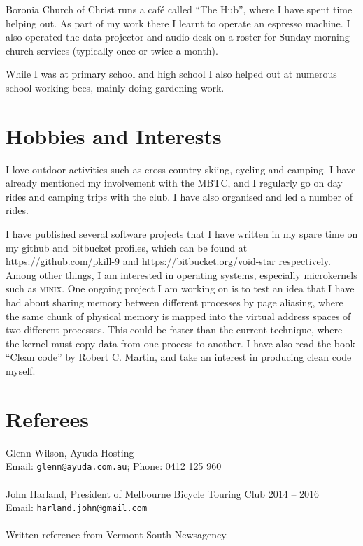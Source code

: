 \documentclass[a4paper]{article}
\begin{document}
Boronia Church of Christ runs a caf\'e called ``The Hub'', where I have
spent time helping out. As part of my work there I learnt to
operate an espresso machine. I 
also operated the data projector and audio desk on a roster for Sunday 
morning church services (typically once or twice a month).

While I was at primary school and high school I also helped out at
numerous school working bees, mainly doing gardening work.


\section{Hobbies and Interests}
I love outdoor activities such as cross country skiing, cycling
and camping. I have already mentioned my involvement with the MBTC, and I
regularly go on day rides and camping trips with the club. I have
also organised and led a number of rides.

I have published several software projects that I have written in my
spare time on my github and bitbucket profiles, which can be found at
\url{https://github.com/pkill-9} and \url{https://bitbucket.org/void-star}
respectively. Among other things, I am interested in operating systems,
especially microkernels such as \textsc{minix}. One ongoing project I am
working on is to test an idea that I have had about sharing memory between
different processes by page aliasing, where the same chunk of physical 
memory is mapped into the virtual address spaces of two different processes.
This could be faster than the current technique, where the kernel must
copy data from one process to another.
I have also read the book
``Clean code'' by Robert C. Martin, and take an interest in producing clean
code myself.




\section{Referees}
Glenn Wilson, Ayuda Hosting\\
Email: \texttt{glenn@ayuda.com.au}; Phone: 0412 125 960\\ \\
John Harland, President of Melbourne Bicycle Touring Club 2014 -- 2016\\
Email: \texttt{harland.john@gmail.com}\\ \\
Written reference from Vermont South Newsagency.
\end{document}
